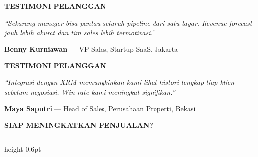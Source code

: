 \documentclass[a4paper]{article}
\newcommand{\sectiontitle}[1]{%
    \vspace{10pt}%
    {\fontsize{13}{16}\selectfont\bfseries\color{BlueDark} #1}\par\vspace{3pt}%
    {\color{BluePrimary}\hrule height 0.6pt}\par\vspace{8pt}}
\begin{document}
\noindent
\begin{minipage}[t]{0.485\textwidth}
    \colorbox{IndigoBg}{%
        \begin{minipage}{\dimexpr\textwidth-2\fboxsep\relax}
            {\fontsize{10}{13}\selectfont\bfseries\color{IndigoDark} TESTIMONI PELANGGAN}
        \end{minipage}}\par
    \vspace{4pt}

    {\fontsize{9}{13}\selectfont\color{TextDark}
    \textit{``Sekarang manager bisa pantau seluruh pipeline dari satu layar. Revenue forecast jauh lebih akurat dan tim sales lebih termotivasi.''}

    \vspace{4pt}
    {\bfseries\color{IndigoDark} Benny Kurniawan} {\color{TextLight}--- VP Sales, Startup SaaS, Jakarta}}
\end{minipage}%
\hfill%
\begin{minipage}[t]{0.485\textwidth}
    \colorbox{IndigoBg}{%
        \begin{minipage}{\dimexpr\textwidth-2\fboxsep\relax}
            {\fontsize{10}{13}\selectfont\bfseries\color{IndigoDark} TESTIMONI PELANGGAN}
        \end{minipage}}\par
    \vspace{4pt}

    {\fontsize{9}{13}\selectfont\color{TextDark}
    \textit{``Integrasi dengan XRM memungkinkan kami lihat histori lengkap tiap klien sebelum negosiasi. Win rate kami meningkat signifikan.''}

    \vspace{4pt}
    {\bfseries\color{IndigoDark} Maya Saputri} {\color{TextLight}--- Head of Sales, Perusahaan Properti, Bekasi}}
\end{minipage}

\vspace{8pt}

\sectiontitle{SIAP MENINGKATKAN PENJUALAN?}
\end{document}
